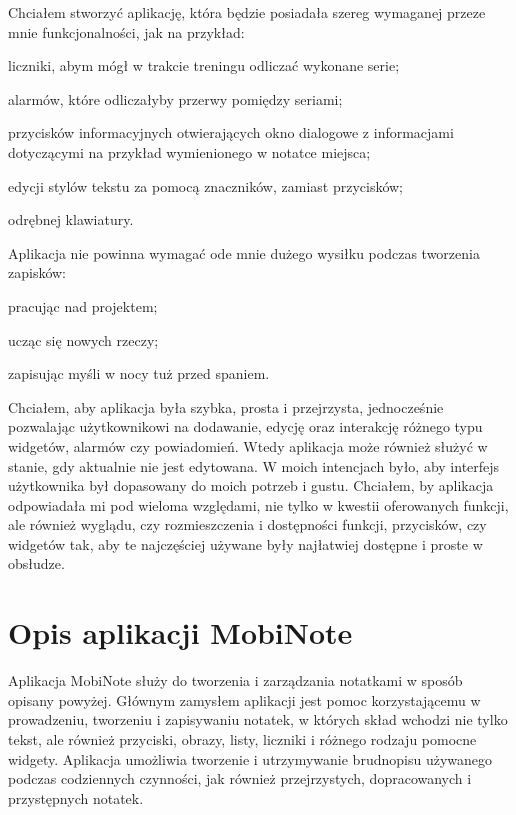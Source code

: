 \documentclass[shortabstract]{iithesis}
\begin{document}
Chciałem stworzyć aplikację, która będzie posiadała szereg wymaganej przeze mnie funkcjonalności, jak na przykład:
\begin{compactitem}
    \item liczniki, abym mógł w trakcie treningu odliczać wykonane serie;
    \item alarmów, które odliczałyby przerwy pomiędzy seriami;
    \item przycisków informacyjnych otwierających okno dialogowe z informacjami dotyczącymi na przykład wymienionego w notatce miejsca;
    \item edycji stylów tekstu za pomocą znaczników, zamiast przycisków;
    \item odrębnej klawiatury. 
\end{compactitem}
Aplikacja nie powinna wymagać ode mnie dużego wysiłku podczas tworzenia zapisków: 
\begin{compactitem}
    \item pracując nad projektem;
    \item ucząc się nowych rzeczy;
    \item zapisując myśli w nocy tuż przed spaniem.
\end{compactitem}
Chciałem, aby aplikacja była szybka, prosta i przejrzysta, jednocześnie pozwalając użytkownikowi na dodawanie, edycję oraz interakcję różnego typu widgetów, alarmów czy powiadomień. Wtedy aplikacja może również służyć w stanie, gdy aktualnie nie jest edytowana. W moich intencjach było, aby interfejs użytkownika był dopasowany do moich potrzeb i gustu. Chciałem, by aplikacja odpowiadała mi pod wieloma względami, nie tylko w kwestii oferowanych funkcji, ale również wyglądu, czy rozmieszczenia i dostępności funkcji, przycisków, czy widgetów tak, aby te najczęściej używane były najłatwiej dostępne i proste w obsłudze.

\section{Opis aplikacji MobiNote}

Aplikacja MobiNote służy do tworzenia i zarządzania notatkami w sposób opisany powyżej.
Głównym zamysłem aplikacji jest pomoc korzystającemu w prowadzeniu, tworzeniu i zapisywaniu notatek, w których skład wchodzi nie tylko tekst, ale również przyciski, obrazy, listy, liczniki i różnego rodzaju pomocne widgety.
Aplikacja umożliwia tworzenie i utrzymywanie brudnopisu używanego podczas codziennych czynności, jak również przejrzystych, dopracowanych i przystępnych  notatek.
\end{document}
